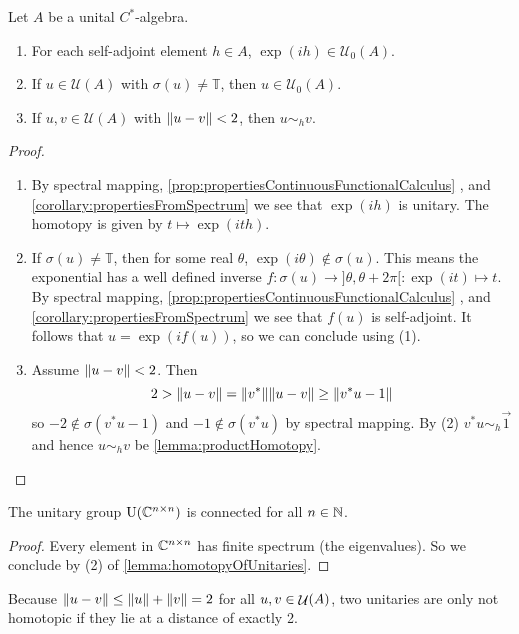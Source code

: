 \begin{lemma} \label{lemma:homotopyOfUnitaries}
Let $A$ be a unital $C^*$-algebra.
\begin{enumerate}
\item For each self-adjoint element $h\in A$, $\exp(ih)\in\mathcal{U}_0(A)$.
\item If $u\in \mathcal{U}(A)$ with $\sigma(u) \neq \mathbb{T}$, then $u\in\mathcal{U}_0(A)$.
\item If $u,v\in\mathcal{U}(A)$ with $\lVert u-v\rVert<2$, then $u\sim_h v$.
\end{enumerate}
\end{lemma}
\begin{proof} \hspace{1em}
\begin{enumerate}
\item By spectral mapping, \ref{prop:propertiesContinuousFunctionalCalculus} , and \ref{corollary:propertiesFromSpectrum} we see that $\exp(ih)$ is unitary. The homotopy is given by $t\mapsto \exp(ith)$.
\item If $\sigma(u) \neq \mathbb{T}$, then for some real $\theta$, $\exp(i\theta)\notin \sigma(u)$. This means the exponential has a well defined inverse $f: \sigma(u) \to ]\theta, \theta+2\pi[: \exp(it)\mapsto t$. By spectral mapping, \ref{prop:propertiesContinuousFunctionalCalculus} , and \ref{corollary:propertiesFromSpectrum} we see that $f(u)$ is self-adjoint. It follows that $u = \exp(if(u))$, so we can conclude using (1).
\item Assume $\lVert u-v\rVert<2$. Then
\[ 2 > \lVert u-v\rVert = \lVert v^*\rVert\lVert u-v\rVert \geq \lVert v^*u - 1\rVert \]
so $-2\notin \sigma(v^*u-1)$ and $-1 \notin \sigma(v^*u)$ by spectral mapping. By (2) $v^*u \sim_h \vec{1}$ and hence $u\sim_h v$ be \ref{lemma:productHomotopy}.
\end{enumerate}
\end{proof}

\begin{corollary}
The unitary group $\operatorname{U}(\mathbb{C}^{n\times n})$ is connected for all $n\in\mathbb{N}$.
\end{corollary}
\begin{proof}
Every element in $\mathbb{C}^{n\times n}$ has finite spectrum (the eigenvalues). So we conclude by (2) of \ref{lemma:homotopyOfUnitaries}.
\end{proof}
Because $\lVert u-v\rVert\leq \lVert u\rVert+\lVert v\rVert = 2$ for all $u,v\in \mathop{\mathcal{U}}\nolimits(A)$, two unitaries are only not homotopic if they lie at a distance of exactly 2.

